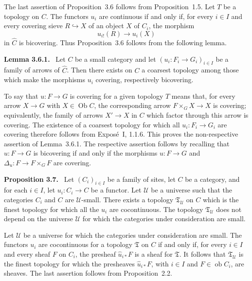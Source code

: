 \documentclass[11pt]{article}
\newcommand{\U}{\mathcal{U}}
\newcommand{\Ob}{\operatorname{Ob}}
\newcommand{\ob}{\operatorname{ob}}
\newenvironment{statement}[1]{\par\medskip\noindent\textbf{#1.}\ }{\par\medskip}
\begin{document}
The last assertion of Proposition~3.6 follows from Proposition~1.5. Let \(T\) be a topology on \(C\). The functors \(u_i\) are continuous if and only if, for every \(i\in I\) and every covering sieve \(R\hookrightarrow X\) of an object \(X\) of \(C_i\), the morphism
\[
u_{i!}(R)\to u_i(X)
\]
in \(\widehat C\) is bicov\-ering. Thus Proposition~3.6 follows from the following lemma.

\begin{statement}{Lemma 3.6.1}
Let \(C\) be a small category and let \((u_i:F_i\to G_i)_{i\in I}\) be a family of arrows of \(\widehat C\). Then there exists on \(C\) a coarsest topology among those which make the morphisms \(u_i\) covering, respectively bicov\-ering.
\end{statement}

To say that \(u:F\to G\) is covering for a given topology \(T\) means that, for every arrow \(X\to G\) with \(X\in\Ob C\), the corresponding arrow \(F\times_GX\to X\) is covering; equivalently, the family of arrows \(X'\to X\) in \(C\) which factor through this arrow is covering. The existence of a coarsest topology for which all \(u_i:F_i\to G_i\) are covering therefore follows from Expos\'e~I, 1.1.6. This proves the non-respective assertion of Lemma~3.6.1. The respective assertion follows by recalling that \(u:F\to G\) is bicov\-ering if and only if the morphisms \(u:F\to G\) and \(\Delta_u:F\to F\times_GF\) are covering.

\begin{statement}{Proposition 3.7}
Let \((C_i)_{i\in I}\) be a family of sites, let \(C\) be a category, and for each \(i\in I\), let \(u_i:C_i\to C\) be a functor. Let \(\U\) be a universe such that the categories \(C_i\) and \(C\) are \(\U\)-small. There exists a topology \(\mathfrak T_{\U}\) on \(C\) which is the finest topology for which all the \(u_i\) are cocontinuous. The topology \(\mathfrak T_{\U}\) does not depend on the universe \(\U\) for which the categories under consideration are small.
\end{statement}

Let \(\U\) be a universe for which the categories under consideration are small. The functors \(u_i\) are cocontinuous for a topology \(\mathfrak T\) on \(C\) if and only if, for every \(i\in I\) and every sheaf \(F\) on \(C_i\), the presheaf \(\widehat u_{i*}F\) is a sheaf for \(\mathfrak T\). It follows that \(\mathfrak T_{\U}\) is the finest topology for which the presheaves \(\widehat u_{i*}F\), with \(i\in I\) and \(F\in\ob C_i\), are sheaves. The last assertion follows from Proposition~2.2.
\end{document}

